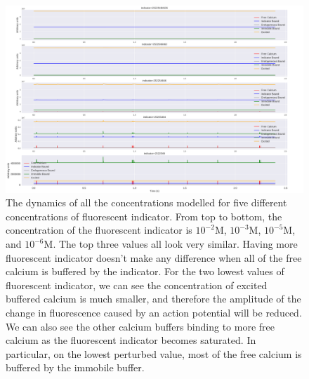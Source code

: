 \documentclass[a4paper,12pt]{article}
\theoremstyle{definition}
\begin{document}
\begin{figure}[ht]
  \centering
  \includegraphics[width=\textwidth]{figures/indicator_peturbed_calcium_dynamics_18.png}
  \caption{The dynamics of all the concentrations modelled for five different concentrations of fluorescent indicator. From top to bottom, the concentration of the fluorescent indicator is $10^{-2}$M, $10^{-3}$M, $10^{-5}$M, and $10^{-6}$M. The top three values all look very similar. Having more fluorescent indicator doesn't make any difference when all of the free calcium is buffered by the indicator. For the two lowest values of fluorescent indicator, we can see the concentration of excited buffered calcium is much smaller, and therefore the amplitude of the change in fluorescence caused by an action potential will be reduced. We can also see the other calcium buffers binding to more free calcium as the fluorescent indicator becomes saturated. In particular, on the lowest perturbed value, most of the free calcium is buffered by the immobile buffer.}
  \label{fig:indicator_peturbed_calcium_dynamics}
\end{figure}
\end{document}
